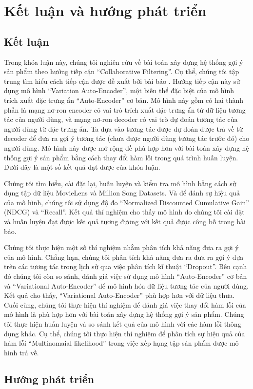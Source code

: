 \chapter{Kết luận và hướng phát triển}
\label{Chapter5}
\section{Kết luận}
Trong khóa luận này, chúng tôi nghiên cứu về bài toán xây dựng hệ thống gợi ý sản phẩm theo hướng tiếp cận ``Collaborative Filtering''.
Cụ thể, chúng tôi tập trung tìm hiểu cách tiếp cận được đề xuất bởi bài báo \cite{mvae}.
Hướng tiếp cận này sử dụng mô hình ``Variation Auto-Encoder'', một biến thể đặc biệt của mô hình trích xuất đặc trưng ẩn ``Auto-Encoder'' cơ bản. 
Mô hình này gồm có hai thành phần là mạng nơ-ron encoder có vai trò trích xuất đặc trưng ẩn từ dữ liệu tương tác của người dùng, và mạng nơ-ron decoder có vai trò dự đoán tương tác của người dùng từ đặc trưng ẩn.
Ta dựa vào tương tác được dự đoán được trả về từ decoder để đưa ra gợi ý tương tác (chưa được người dùng tương tác trước đó) cho người dùng.
Mô hình này được mở rộng đề phù hợp hơn với bài toán xây dựng hệ thống gợi ý sản phẩm bằng cách thay đổi hàm lỗi trong quá trình huấn luyện.
Dưới đây là một số kết quả đạt được của khóa luận. 

Chúng tôi tìm hiểu, cài đặt lại, huấn luyện và kiểm tra mô hình bằng cách sử dụng tập dữ liệu MovieLens và Million Song Datasets. 
Và để đánh sự hiệu quả của mô hình, chúng tôi sử dụng độ đo ``Normalized Discounted Cumulative Gain'' (NDCG) và ``Recall''.
Kết quả thí nghiệm cho thấy mô hình do chúng tôi cài đặt và huấn luyện đạt được kết quả tương đương với kết quả được công bố trong bài báo. 

Chúng tôi thực hiện một số thí nghiệm nhằm phân tích khả năng đưa ra gợi ý của mô hình.
Chẳng hạn, chúng tôi phân tích khả năng đưa ra đưa ra gợi ý dựa trên các tương tác trong lịch sử qua việc phân tích kĩ thuật ``Dropout''.
Bên cạnh đó chúng tôi còn so sánh, dánh giá việc sử dụng mô hình ``Auto-Encoder'' cơ bản và ``Variational Auto-Encoder'' để mô hình hóa dữ liệu tương tác của người dùng. 
Kết quả cho thấy, ``Variational Auto-Encoder'' phù hợp hơn với dữ liệu thưa.
Cuối cùng, chúng tôi thực hiện thí nghiệm để dánh giá việc thay đổi hàm lỗi của mô hình là phù hợp hơn với bài toán xây dựng hệ thống gợi ý sản phẩm.
Chúng tôi thực hiện huấn luyện và so sánh kết quả của mô hình với các hàm lỗi thông dụng khác. 
Cụ thể, chúng tôi thực hiện thí nghiệm để phân tích sự hiệu quả của hàm lỗi ``Multinomaial likelihood'' trong việc xếp hạng tập sản phẩm được mô hình trả về.

\section{Hướng phát triển}
